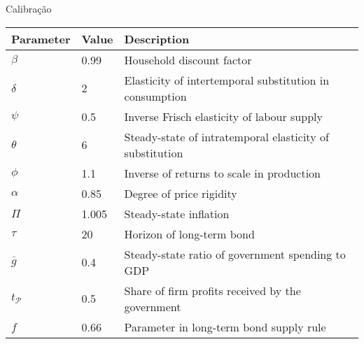 \documentclass{beamer}
\begin{document}
\begin{frame}{Calibração}
    \begin{table}[h!]
        \centering
        \small
    \begin{tabular}{lll}
        \hline Parameter & Value & Description \\ \hline\hline
        $\beta$ & 0.99 & Household discount factor \\
        $\delta$ & 2 & Elasticity of intertemporal substitution in consumption \\
        $\psi$ & 0.5 & Inverse Frisch elasticity of labour supply \\
        $\theta$ & 6 & Steady-state of intratemporal elasticity of substitution \\
        $\phi$ & 1.1 & Inverse of returns to scale in production \\
        $\alpha$ & 0.85 & Degree of price rigidity \\
        $\Pi$ & 1.005 & Steady-state inflation \\
        $\tau$ & 20 & Horizon of long-term bond \\
        $\bar{g}$ & 0.4 & Steady-state ratio of government spending to GDP \\
        $t_{\mathcal{P}}$ & 0.5 & Share of firm profits received by the government \\
        $f$ & 0.66 & Parameter in long-term bond supply rule \\
        \hline
    \end{tabular}
    \end{table}
\end{frame}
\end{document}
